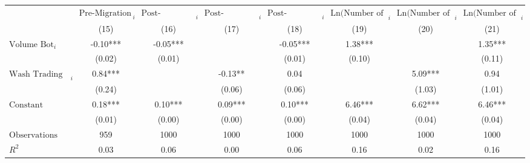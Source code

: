 \begin{tabular}{lccccccc}
\hline
\hline
 & $\text{Pre-Migration Volatility}_{i}$ & $\text{Post-Migration Volatility}_{i}$ & $\text{Post-Migration Volatility}_{i}$ & $\text{Post-Migration Volatility}_{i}$ & $\text{Ln(Number of Traders)}_{i}$ & $\text{Ln(Number of Traders)}_{i}$ & $\text{Ln(Number of Traders)}_{i}$ \\
 & (15) & (16) & (17) & (18) & (19) & (20) & (21) \\
\hline
$\text{Volume Bot}_{i}$ & -0.10*** & -0.05*** &  & -0.05*** & 1.38*** &  & 1.35*** \\
 & (0.02) & (0.01) &  & (0.01) & (0.10) &  & (0.11) \\
$\text{Wash Trading Volume \%}_{i}$ & 0.84*** &  & -0.13** & 0.04 &  & 5.09*** & 0.94 \\
 & (0.24) &  & (0.06) & (0.06) &  & (1.03) & (1.01) \\
$\text{Constant}$ & 0.18*** & 0.10*** & 0.09*** & 0.10*** & 6.46*** & 6.62*** & 6.46*** \\
 & (0.01) & (0.00) & (0.00) & (0.00) & (0.04) & (0.04) & (0.04) \\
$\text{Observations}$ & 959 & 1000 & 1000 & 1000 & 1000 & 1000 & 1000 \\
$R^2$ & 0.03 & 0.06 & 0.00 & 0.06 & 0.16 & 0.02 & 0.16 \\
\hline
\end{tabular}